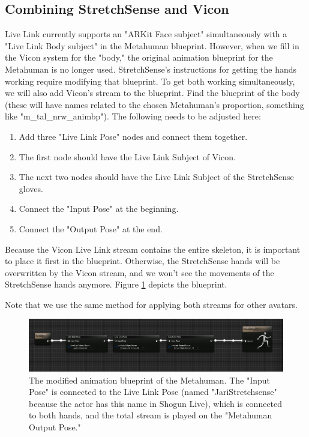 \documentclass{uva-inf-article}
\begin{document}
\subsection{Combining StretchSense and Vicon}
Live Link currently supports an "ARKit Face subject" simultaneously with a "Live Link Body subject" in the Metahuman blueprint. However, when we fill in the Vicon system for the "body," the original animation blueprint for the Metahuman is no longer used. StretchSense's instructions for getting the hands working require modifying that blueprint. To get both working simultaneously, we will also add Vicon's stream to the blueprint. Find the blueprint of the body (these will have names related to the chosen Metahuman's proportion, something like "m\_tal\_nrw\_animbp"). The following needs to be adjusted here:
\begin{enumerate}
    \item Add three "Live Link Pose" nodes and connect them together.
    \item The first node should have the Live Link Subject of Vicon.
    \item The next two nodes should have the Live Link Subject of the StretchSense gloves.
    \item Connect the "Input Pose" at the beginning.
    \item Connect the "Output Pose" at the end.
\end{enumerate}
Because the Vicon Live Link stream contains the entire skeleton, it is important to place it first in the blueprint. Otherwise, the StretchSense hands will be overwritten by the Vicon stream, and we won't see the movements of the StretchSense hands anymore. Figure \ref{fig:animbp} depicts the blueprint.

Note that we use the same method for applying both streams for other avatars.

\begin{landscape}
\vspace*{\fill}
\begin{figure}[hbt!]
    \centering
    \includegraphics[width=1.5\textheight]{imgs/animbp.png}
    \caption{The modified animation blueprint of the Metahuman. The "Input Pose" is connected to the Live Link Pose (named "JariStretchsense" because the actor has this name in Shogun Live), which is connected to both hands, and the total stream is played on the "Metahuman Output Pose."}
    \label{fig:animbp}
\end{figure}
\vspace*{\fill}
\end{landscape}
\end{document}
